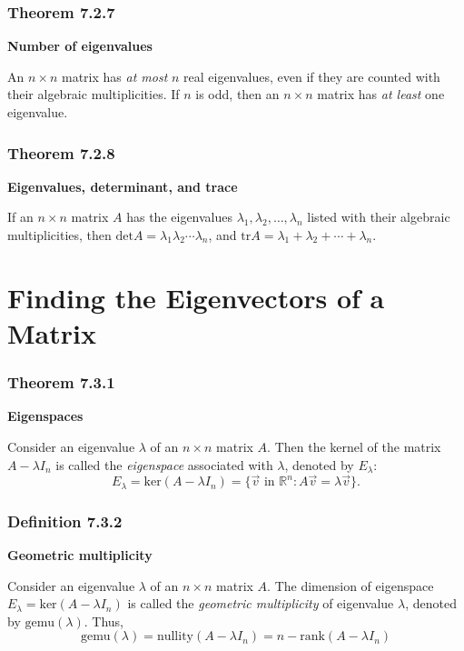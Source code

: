 \documentclass{report}
\begin{document}
\subsubsection*{Theorem 7.2.7}
\par\noindent\textbf{Number of eigenvalues}
\par\noindent An $n\times{}n$ matrix has \textit{at most} $n$ real eigenvalues, even if they are counted with their algebraic multiplicities. If $n$ is odd, then an $n\times{}n$ matrix has \textit{at least} one eigenvalue.
\subsubsection*{Theorem 7.2.8}
\par\noindent\textbf{Eigenvalues, determinant, and trace}
\par\noindent If an $n\times{}n$ matrix $A$ has the eigenvalues $\lambda{}_{1},\lambda{}_{2},\ldots{},\lambda{}_{n}$ listed with their algebraic multiplicities, then $\textrm{det}A=\lambda{}_{1}\lambda{}_{2}\cdots{}\lambda{}_{n}$, and $\textrm{tr}A=\lambda{}_{1}+\lambda{}_{2}+\cdots{}+\lambda{}_{n}$.

\section{Finding the Eigenvectors of a Matrix}
\subsubsection*{Theorem 7.3.1}
\par\noindent\textbf{Eigenspaces}
\par\noindent Consider an eigenvalue $\lambda{}$ of an $n\times{}n$ matrix $A$. Then the kernel of the matrix $A-\lambda{}I_{n}$ is called the \textit{eigenspace} associated with $\lambda{}$, denoted by $E_{\lambda{}}$:
\[E_\lambda{}=\textrm{ker}(A-\lambda{}I_{n})=\{\vec{v}\textrm{ in }\mathbb{R}^{n}:A\vec{v}=\lambda{}\vec{v}\}.\]
\subsubsection*{Definition 7.3.2}
\par\noindent\textbf{Geometric multiplicity}
\par\noindent Consider an eigenvalue $\lambda{}$ of an $n\times{}n$ matrix $A$. The dimension of eigenspace $E_{\lambda{}}=\textrm{ker}(A-\lambda{}I_{n})$ is called the \textit{geometric multiplicity} of eigenvalue $\lambda{}$, denoted by $\textrm{gemu}(\lambda{})$. Thus,
\[\textrm{gemu}(\lambda{})=\textrm{nullity}(A-\lambda{}I_{n})=n-\textrm{rank}(A-\lambda{}I_{n})\]
\end{document}
